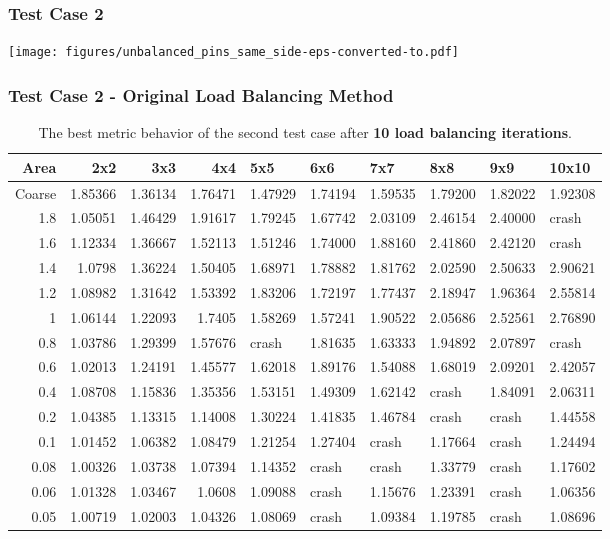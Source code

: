 \documentclass[compress]{beamer}
\begin{document}
\begin{frame}[t]\frametitle{Test Case 2}
\centering
\texttt{[image: figures/unbalanced\_pins\_same\_side-eps-converted-to.pdf]}
\end{frame}

\begin{frame}[t]\frametitle{Test Case 2 - Original Load Balancing Method}
\begin{table}[H]
\centering
\tiny
\caption{The best metric behavior of the second test case after \textbf{10 load balancing iterations}.} 
\begin{tabular}{rrrrllllll}
\hline
  Area & 2x2 &3x3 & 4x4 & 5x5 & 6x6 & 7x7 &8x8 & 9x9 & 10x10 \\ 
\hline
 Coarse    & 1.85366 & 1.36134 & 1.76471 & 1.47929 & 1.74194 & 1.59535 & 1.79200 & 1.82022 & 1.92308 \\
  1.8  & 1.05051 & 1.46429 & 1.91617 & 1.79245 & 1.67742 & 2.03109 & 2.46154 & 2.40000 & crash   \\
  1.6  & 1.12334 & 1.36667 & 1.52113 & 1.51246 & 1.74000 & 1.88160 & 2.41860 & 2.42120 & crash   \\
  1.4  & 1.0798  & 1.36224 & 1.50405 & 1.68971 & 1.78882 & 1.81762 & 2.02590 & 2.50633 & 2.90621 \\
  1.2  & 1.08982 & 1.31642 & 1.53392 & 1.83206 & 1.72197 & 1.77437 & 2.18947 & 1.96364 & 2.55814 \\
  1    & 1.06144 & 1.22093 & 1.7405  & 1.58269 & 1.57241 & 1.90522 & 2.05686 & 2.52561 & 2.76890 \\
  0.8  & 1.03786 & 1.29399 & 1.57676 & crash   & 1.81635 & 1.63333 & 1.94892 & 2.07897 & crash   \\
  0.6  & 1.02013 & 1.24191 & 1.45577 & 1.62018 & 1.89176 & 1.54088 & 1.68019 & 2.09201 & 2.42057 \\
  0.4  & 1.08708 & 1.15836 & 1.35356 & 1.53151 & 1.49309 & 1.62142 & crash   & 1.84091 & 2.06311 \\
  0.2  & 1.04385 & 1.13315 & 1.14008 & 1.30224 & 1.41835 & 1.46784 & crash   & crash   & 1.44558 \\
  0.1  & 1.01452 & 1.06382 & 1.08479 & 1.21254 & 1.27404 & crash   & 1.17664 & crash   & 1.24494 \\
  0.08 & 1.00326 & 1.03738 & 1.07394 & 1.14352 & crash   & crash   & 1.33779 & crash   & 1.17602 \\
  0.06 & 1.01328 & 1.03467 & 1.0608  & 1.09088 & crash   & 1.15676 & 1.23391 & crash   & 1.06356 \\
  0.05 & 1.00719 & 1.02003 & 1.04326 & 1.08069 & crash   & 1.09384 & 1.19785 & crash   & 1.08696 \\

\end{tabular}
\end{table}
\end{frame}
\end{document}
